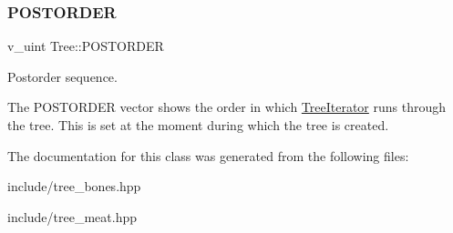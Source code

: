\subsubsection{\texorpdfstring{P\+O\+S\+T\+O\+R\+D\+ER}{POSTORDER}}
{\footnotesize\ttfamily v\+\_\+uint Tree\+::\+P\+O\+S\+T\+O\+R\+D\+ER\hspace{0.3cm}{\ttfamily [protected]}}



Postorder sequence. 

The P\+O\+S\+T\+O\+R\+D\+ER vector shows the order in which \hyperlink{classTreeIterator}{Tree\+Iterator} runs through the tree. This is set at the moment during which the tree is created. 

The documentation for this class was generated from the following files\+:\begin{DoxyCompactItemize}
\item 
include/tree\+\_\+bones.\+hpp\item 
include/tree\+\_\+meat.\+hpp\end{DoxyCompactItemize}
